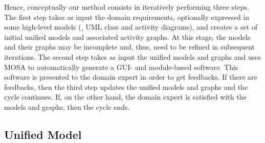 Hence, conceptually our method consists in iteratively performing three steps. The first step takes as input the domain requirements, optionally expressed in some high-level models (\eg, UML class and activity diagrams), and creates a set of initial unified models and associated activity graphs. At this stage, the models and their graphs may be incomplete and, thus, need to be refined in subsequent iterations. The second step takes as input the unified models and graphs and uses MOSA to automatically generate a GUI- and module-based software. This software is presented to the domain expert in order to get feedbacks. If there are feedbacks, then the third step updates the unified models and graphs and the cycle continues. If, on the other hand, the domain expert is satisfied with the models and graphs, then the cycle ends.

\subsection{Unified Model}

